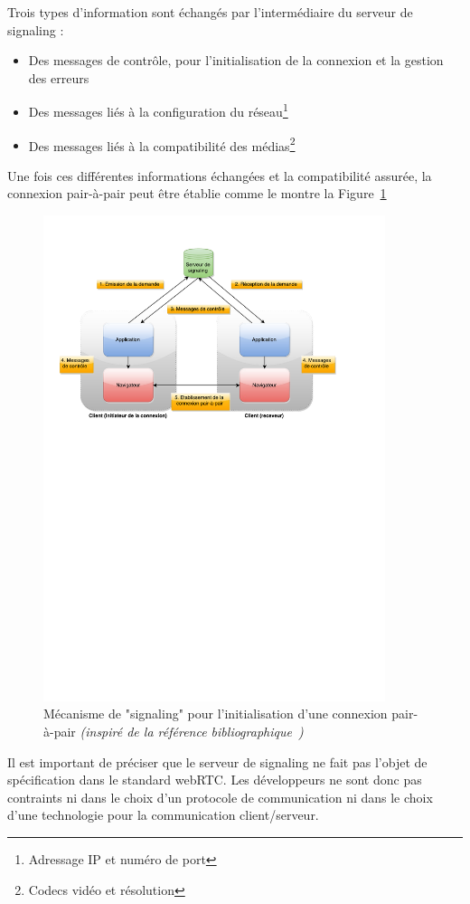 \documentclass{tnreport}
\begin{document}
Trois types d'information sont échangés par l'intermédiaire du serveur de signaling :
\begin{itemize}
    \item Des messages de contrôle, pour l'initialisation de la connexion et la gestion des erreurs
    \item Des messages liés à la configuration du réseau\footnote{Adressage IP et numéro de port}
    \item Des messages liés à la compatibilité des médias\footnote{Codecs vidéo et résolution}\\
\end{itemize}

Une fois ces différentes informations échangées et la compatibilité assurée, la connexion pair-à-pair peut être établie comme le montre la Figure~\ref{fig:signaling}

\begin{figure}[!h]
  \centering
  \includegraphics[width=10cm]{figures/signaling}
  \caption{Mécanisme de "signaling" pour l'initialisation d'une connexion pair-à-pair \emph{(inspiré de la référence bibliographique~\cite{GettingStartedwithWebRTC})}}
  \label{fig:signaling}
\end{figure}

Il est important de préciser que le serveur de signaling ne fait pas l'objet de spécification dans le standard webRTC. Les développeurs ne sont donc pas contraints ni dans le choix d'un protocole de communication ni dans le choix d'une technologie pour la communication client/serveur.
\end{document}
